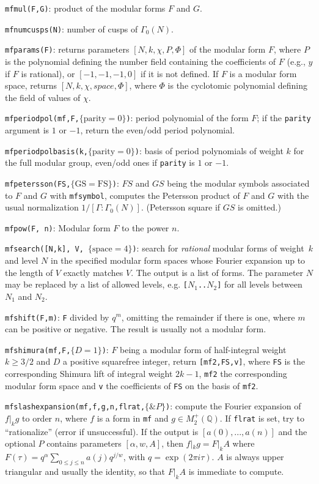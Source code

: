 \documentclass[11pt]{article}
\newcommand{\Q}{{\mathbb Q}}
\newcommand{\al}{\alpha}
\newcommand{\G}{\Gamma}
\def\kbd#1{{\tt #1}}
\begin{document}
\f\kbd{mfmul(F,G)}: product of the modular forms $F$ and $G$.

\f\kbd{mfnumcusps(N)}: number of cusps of $\G_0(N)$.

\f\kbd{mfparams(F)}: returns parameters $[N,k,\chi,P,\Phi]$ of the modular form
$F$, where $P$ is the polynomial defining the number field containing the
coefficients of $F$ (e.g., $y$ if $F$ is rational), or $[-1,-1,-1,0]$ if
it is not defined. If $F$ is a modular form space, returns
$[N,k,\chi,space,\Phi]$, where $\Phi$ is the cyclotomic polynomial defining
the field of values of $\chi$.

\f\kbd{mfperiodpol(mf,F,$\{\text{parity}=0\}$)}: period polynomial of the
form $F$; if the \kbd{parity} argument is $1$ or $-1$, return the even/odd
period polynomial.

\f\kbd{mfperiodpolbasis(k,$\{\text{parity}=0\}$)}: basis of period polynomials of weight
$k$ for the full modular group, even/odd ones if \kbd{parity} is $1$ or $-1$.

\f\kbd{mfpetersson(FS,$\{\text{GS}=\text{FS}\}$)}: $FS$ and $GS$ being the modular symbols associated
to $F$ and $G$ with \kbd{mfsymbol}, computes the Petersson product of $F$ and
$G$ with the usual normalization $1/[\G:\G_0(N)]$. (Petersson square if $GS$
is omitted.)

\f\kbd{mfpow(F, n)}: Modular form $F$ to the power $n$.

\f\kbd{mfsearch([N,k], V, $\{\text{space}=4\}$)}: search for \emph{rational}
modular forms of weight~$k$ and level $N$ in the specified modular
form spaces whose Fourier expansion up to the length of $V$ exactly matches
$V$. The output is a list of forms. The parameter $N$ may be replaced
by a list of allowed levels, e.g. \kbd{[$N_1$..$N_2$]} for all levels
between $N_1$ and $N_2$.

\f\kbd{mfshift(F,m)}: \kbd{F} divided by $q^m$, omitting the remainder if there
is one, where $m$ can be positive or negative. The result is usually not
a modular form.

\f\kbd{mfshimura(mf,F,$\{D = 1\}$)}: $F$ being a modular form of
half-integral weight $k\ge3/2$ and $D$ a positive squarefree integer, return
\kbd{[mf2,FS,v]}, where \kbd{FS} is the corresponding Shimura lift of integral
weight $2k-1$, \kbd{mf2} the corresponding modular form space and \kbd{v} the
coefficients of \kbd{FS} on the basis of \kbd{mf2}.

\f\kbd{mfslashexpansion(mf,f,g,n,flrat,$\{\&P\}$)}: compute the Fourier
expansion of $f|_k g$ to order $n$, where $f$ is a form in \kbd{mf} and
$g\in M_2^+(\Q)$. If \kbd{flrat} is set, try to ``rationalize''
(error if unsuccessful). If the output is $[a(0),...,a(n)]$ and the
optional $P$ contains parameters $[\al,w,A]$, then $f|_k g = F|_k A$
where
$F(\tau) = q^{\al}\sum_{0\le j\le n}a(j)q^{j/w}$, with $q=\exp(2\pi i\tau)$.
$A$ is always upper triangular and usually the identity, so that $F|_k A$
is immediate to compute.
\end{document}
